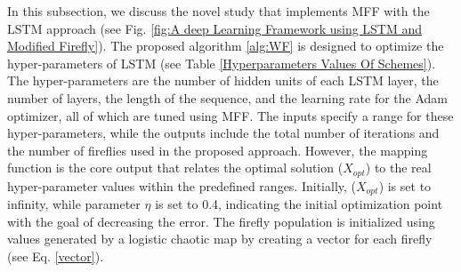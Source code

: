 \documentclass[journal]{IEEEtran}
\begin{document}
            In this subsection, we discuss the novel study that implements MFF with the LSTM approach (see Fig. \ref{fig:A deep Learning Framework using LSTM and Modified Firefly}).
            The proposed algorithm \ref{alg:WF} is designed to optimize the hyper-parameters of LSTM (see Table \ref{Hyperparameters Values Of Schemes}). The hyper-parameters are the number of hidden units of each LSTM layer, the number of layers, the length of the sequence, and the learning rate for the Adam optimizer, all of which are tuned using MFF. The inputs specify a range for these hyper-parameters, while the outputs include the total number of iterations and the number of fireflies used in the proposed approach. However, the mapping function is the core output that relates the optimal solution ($X_{opt}$) to the real hyper-parameter values within the predefined ranges.
Initially, ($X_{opt}$) is set to infinity, while parameter $\eta$ is set to 0.4, indicating the initial optimization point with the goal of decreasing the error. The firefly population is initialized using values generated by a logistic chaotic map by creating a vector for each firefly (see Eq. \eqref{vector}).
\end{document}
